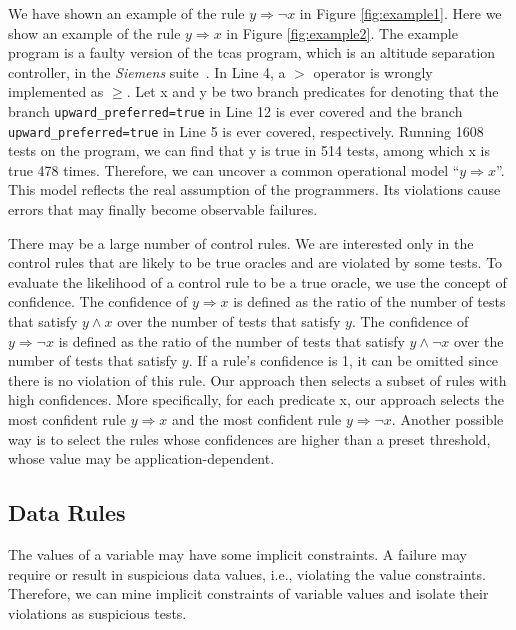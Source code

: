 \documentclass{sig-alternate}
\newcommand{\CodeIn}[1]{{\small\texttt{#1}}}
\begin{document}
We have shown an example of the rule $y\Rightarrow \neg x$ in Figure
\ref{fig:example1}. Here we show an example of the rule
$y\Rightarrow x$ in Figure \ref{fig:example2}. The example program
is a faulty version of the tcas program, which is an altitude
separation controller, in the \emph{Siemens}
suite~\cite{Hutchins94}. In Line 4, a $>$ operator is wrongly
implemented as $\ge$. Let x and y be two branch predicates for
denoting that the branch \CodeIn{upward\_preferred=true} in Line 12
is ever covered and the branch \CodeIn{upward\_preferred=true} in
Line 5 is ever covered, respectively. Running 1608 tests on the
program, we can find that y is true in 514 tests, among which x is
true 478 times. Therefore, we can uncover a common operational model
``$y\Rightarrow x$''. This model reflects the real assumption of the
programmers. Its violations cause errors that may finally become
observable failures.



There may be a large number of control rules. We are interested only
in the control rules that are likely to be true oracles and are
violated by some tests. To evaluate the likelihood of a control rule
to be a true oracle, we use the concept of confidence. The
confidence of $y\Rightarrow x$ is defined as the ratio of the number
of tests that satisfy $y\wedge x$ over the number of tests that
satisfy $y$. The confidence of $y\Rightarrow \neg x$ is defined as
the ratio of the number of tests that satisfy $y\wedge \neg x$ over
the number of tests that satisfy $y$. If a rule's confidence is 1,
it can be omitted since there is no violation of this rule. Our
approach then selects a subset of rules with high confidences. More
specifically, for each predicate x, our approach selects the most
confident rule $y\Rightarrow x$ and the most confident rule
$y\Rightarrow \neg x$. Another possible way is to select the rules
whose confidences are higher than a preset threshold, whose value
may be application-dependent.





\subsection{Data Rules}

The values of a variable may have some implicit constraints. A
failure may require or result in suspicious data values, i.e.,
violating the value constraints. Therefore, we can mine implicit
constraints of variable values and isolate their violations as
suspicious tests.
\end{document}
